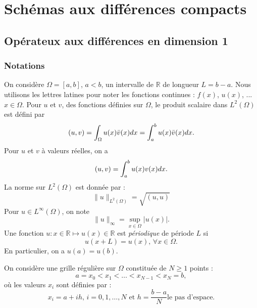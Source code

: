 \chapter{Schémas aux différences compacts}

\section{Opérateux aux différences en dimension 1}

\subsection{Notations}
\label{sec:notation_1D}

On considère $\Omega = [a,b]$, $a<b$, un intervalle de $\mathbb{R}$ de longueur $L=b-a$. Nous utilisons les lettres latines pour noter les fonctions continues : $f(x)$, $u(x)$, ... $x \in \Omega$. Pour $u$ et $v$, des fonctions définies sur $\Omega$, le produit scalaire dans $L^2 ( \Omega )$ est défini par
\begin{equation}
(u,v) = \displaystyle\int_{\Omega} u(x) \bar{v}(x) dx = \displaystyle\int_{a}^b u(x) \bar{v}(x) dx.
\end{equation}
Pour $u$ et $v$ à valeurs réelles, on a
\begin{equation}
(u,v) = \displaystyle\int_{a}^b u(x) v(x) dx.
\end{equation}
La norme sur $L^2(\Omega)$ est donnée par :
\begin{equation}
\| u \|_{L^2(\Omega)} = \sqrt{(u,u)}
\end{equation}
Pour $u \in L^{\infty}(\Omega)$, on note
\begin{equation}
\| u \|_{\infty} = \sup_{x\in\Omega} |u(x)|.
\end{equation}
Une fonction $u : x \in \mathbb{R} \mapsto u(x) \in \mathbb{R}$ est \textit{périodique} de période $L$ si 
\begin{equation}
u(x+L) = u(x) \text{, } \forall x \in \Omega.
\end{equation}
En particulier, on a $u(a)=u(b)$.

On considère une grille régulière sur $\Omega$ constituée de $N \geq 1$ points :
\begin{equation}
a=x_0 < x_1 < \ldots < x_{N-1} < x_N = b,
\end{equation}
où les valeurs $x_i$ sont définies par :
\begin{equation}
x_i = a + ih\text{, } i = 0,1, \ldots,N \text{ et } h = \dfrac{b-a}{N} \text{le pas d'espace}. 
\end{equation}

